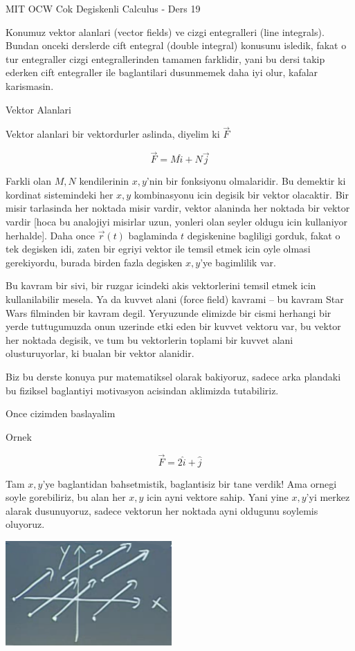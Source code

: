 \documentclass[12pt,fleqn]{article}
\begin{document}
MIT OCW Cok Degiskenli Calculus - Ders 19

Konumuz vektor alanlari (vector fields) ve cizgi entegralleri (line
integrals). Bundan onceki derslerde cift entegral (double integral)
konusunu isledik, fakat o tur entegraller cizgi entegrallerinden tamamen
farklidir, yani bu dersi takip ederken cift entegraller ile baglantilari
dusunmemek daha iyi olur, kafalar karismasin. 

Vektor Alanlari

Vektor alanlari bir vektordurler aslinda, diyelim ki $\vec{F}$

\[ \vec{F} = M\hat{i} + N\vec{j} \]

Farkli olan $M,N$ kendilerinin $x,y$'nin bir fonksiyonu olmalaridir. Bu
demektir ki kordinat sistemindeki her $x,y$ kombinasyonu icin degisik bir
vektor olacaktir. Bir misir tarlasinda her noktada misir vardir, vektor
alaninda her noktada bir vektor vardir [hoca bu analojiyi misirlar uzun,
yonleri olan seyler oldugu icin kullaniyor herhalde]. Daha once
$\vec{r}(t)$ baglaminda $t$ degiskenine bagliligi gorduk, fakat o tek
degisken idi, zaten bir egriyi vektor ile temsil etmek icin oyle olmasi
gerekiyordu, burada birden fazla degisken $x,y$'ye bagimlilik var. 

Bu kavram bir sivi, bir ruzgar icindeki akis vektorlerini temsil etmek icin
kullanilabilir mesela. Ya da kuvvet alani (force field) kavrami -- bu
kavram Star Wars filminden bir kavram degil. Yeryuzunde elimizde bir cismi
herhangi bir yerde tuttugumuzda onun uzerinde etki eden bir kuvvet vektoru
var, bu vektor her noktada degisik, ve tum bu vektorlerin toplami bir
kuvvet alani olusturuyorlar, ki bualan bir vektor alanidir. 

Biz bu derste konuya pur matematiksel olarak bakiyoruz, sadece arka
plandaki bu fiziksel baglantiyi motivasyon acisindan aklimizda
tutabiliriz. 

Once cizimden baslayalim

Ornek

\[ \vec{F} = 2\hat{i} + \hat{j} \]

Tam $x,y$'ye baglantidan bahsetmistik, baglantisiz bir tane verdik! Ama
ornegi soyle gorebiliriz, bu alan her $x,y$ icin ayni vektore sahip. Yani
yine $x,y$'yi merkez alarak dusunuyoruz, sadece vektorun her noktada ayni
oldugunu soylemis oluyoruz.

\includegraphics[height=4cm]{19_1.png}
\end{document}
